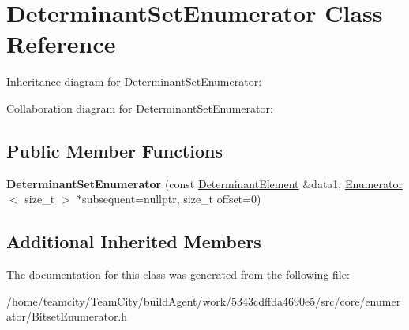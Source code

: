 \hypertarget{classDeterminantSetEnumerator}{}\section{Determinant\+Set\+Enumerator Class Reference}
\label{classDeterminantSetEnumerator}


Inheritance diagram for Determinant\+Set\+Enumerator\+:


Collaboration diagram for Determinant\+Set\+Enumerator\+:
\subsection*{Public Member Functions}
\begin{DoxyCompactItemize}
\item 
{\bfseries Determinant\+Set\+Enumerator} (const \hyperlink{classDeterminantElement}{Determinant\+Element} \&data1, \hyperlink{classEnumerator}{Enumerator}$<$ size\+\_\+t $>$ $\ast$subsequent=nullptr, size\+\_\+t offset=0)\hypertarget{classDeterminantSetEnumerator_ad0f4b145140c6f643c0a1d849b2cd527}{}\label{classDeterminantSetEnumerator_ad0f4b145140c6f643c0a1d849b2cd527}

\end{DoxyCompactItemize}
\subsection*{Additional Inherited Members}


The documentation for this class was generated from the following file\+:\begin{DoxyCompactItemize}
\item 
/home/teamcity/\+Team\+City/build\+Agent/work/5343cdffda4690e5/src/core/enumerator/Bitset\+Enumerator.\+h\end{DoxyCompactItemize}

